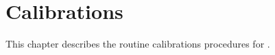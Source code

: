 \chapter{Calibrations}

This chapter describes the routine calibrations procedures for {\projectname}.